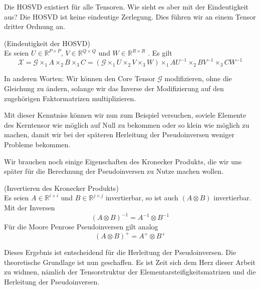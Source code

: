 Die HOSVD existiert für alle Tensoren. Wie sieht es aber mit der Eindeutigkeit aus? Die HOSVD ist keine eindeutige Zerlegung. Dies führen wir an einem Tensor dritter Ordnung an.

\begin{Beispiel} (Eindeutigkeit der HOSVD) \\
Es seien $U \in \mathbb{R}^{P \times P}$, $V \in \mathbb{R}^{Q \times Q}$  und $W \in \mathbb{R}^{R \times R}$ . Es gilt
\begin{equation}
{\pmb{\mathscr{X}}} = {\pmb{\mathscr{G}}} \times_1 A \times_2 B \times_3 C = ({\pmb{\mathscr{G}}} \times_1 U \times_2 V \times_3 W) \times_1 AU^{-1} \times_2 BV^{-1} \times_3 CW^{-1}
\end{equation}
\end{Beispiel}

In anderen Worten: Wir können den Core Tensor ${\pmb{\mathscr{G}}}$ modifizieren, ohne die Gleichung zu ändern, solange wir das Inverse der Modifizierung auf den zugehörigen Faktormatrizen multiplizieren.

Mit dieser Kenntniss können wir nun zum Beispiel versuchen, soviele Elemente des Kerntensor wie möglich auf Null zu bekommen oder so klein wie möglich zu machen, damit wir bei der späteren Herleitung der Pseudoinversen weniger Probleme bekommen. 

Wir brauchen noch einige Eigenschaften des Kronecker Produkts, die wir uns später für die Berechnung der Pseudoinversen zu Nutze machen wollen.

\begin{Lemma} (Invertieren des Kronecker Produkts) \\
Es seien $A \in \mathbb{R}^{i \times i}$ und $B \in \mathbb{R}^{j \times j}$ invertierbar, so ist auch $(A \otimes B)$ invertierbar. Mit der Inversen
\begin{equation*}
(A \otimes B)^{-1} = A^{-1} \otimes B^{-1}
\end{equation*}
Für die Moore Penrose Pseudoinversen gilt analog
\begin{equation*}
(A \otimes B)^{+} = A^{+} \otimes B^{+}
\end{equation*}
\end{Lemma}

Dieses Ergebnis ist entscheidend für die Herleitung der Pseudoinversen. Die theoretische Grundlage ist nun geschaffen. Es ist Zeit sich dem Herz dieser Arbeit zu widmen, nämlich der Tensorstruktur der Elementarsteifigkeitsmatrizen und die Herleitung der Pseudoinversen.

